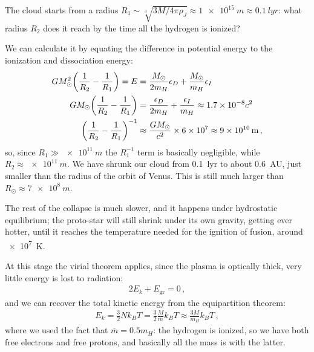 \documentclass[main.tex]{subfiles}
\begin{document}
The cloud starts from a radius \(R_1 \sim \sqrt[3]{3 M / 4 \pi \rho _J} \approx \SI{1e15}{m} \approx \SI{0.1}{lyr}\): what radius \(R_2 \) does it reach by the time all the hydrogen is ionized?

We can calculate it by equating the difference in potential energy to the ionization and dissociation energy: 
%
\begin{align}
GM_{\odot}^2 \qty( \frac{1}{R_2} - \frac{1}{R_1 }) = E 
&= \frac{M_{\odot}}{2 m_H} \epsilon_{D} + \frac{M_{\odot}}{m_H} \epsilon_{I}  \\
GM_{\odot} \qty(\frac{1}{R_2} - \frac{1}{R_1 }) &= \frac{\epsilon _D}{2 m_H} + \frac{\epsilon _I}{m_H} \approx \num{1.7e-8} c^2  \\
\qty( \frac{1}{R_2 } - \frac{1}{R_1 })^{-1} &\approx \frac{GM_{\odot}}{c^2} \times \num{6e7} \approx \SI{9e10}{m} 
\,,
\end{align}
%
so, since \(R_1 \gg \SI{e11}{m}\) the \(R_1^{-1}\) term is basically negligible, while \(R_2 \approx \SI{e11}{m}\). 
We have shrunk our cloud from \SI{0.1}{lyr} to about \SI{0.6}{AU}, just smaller than the radius of the orbit of Venus. This is still much larger than \(R_{\odot} \approx \SI{7e8}{m}\).

The rest of the collapse is much slower, and it happens under hydrostatic equilibrium; the proto-star will still shrink under its own gravity, getting ever hotter, until it reaches the temperature needed for the ignition of fusion, around \SI{e7}{K}. 

At this stage the virial theorem applies, since the plasma is optically thick, very little energy is lost to radiation: 
%
\begin{align}
  2E_{k} + E _{\text{gr}} =0
\,,
\end{align}
%
and we can recover the total kinetic energy from the equipartition theorem:
%
\begin{align}
  E_k = \frac{3}{2} N k_B T = \frac{3}{2} \frac{M}{\overline{m}} k_B T \approx \frac{3M}{m_H} k_B T
\,,
\end{align}
%
where we used the fact that \(\overline{m} = 0.5 m_H\): the hydrogen is ionized, so we have both free electrons and free protons, and basically all the mass is with the latter.
\end{document}
